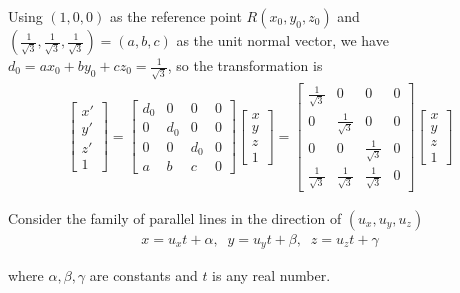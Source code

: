\documentclass[11pt]{article}  %
\begin{document}
    Using $(1,0,0)$ as the reference point $R(x_0,y_0,z_0)$ and $(\frac{1}{\sqrt{3}},\frac{1}{\sqrt{3}},\frac{1}{\sqrt{3}})=(a,b,c)$ as the unit normal vector, we have $d_0=ax_0 + by_0 + cz_0=\frac{1}{\sqrt{3}}$, so the transformation is
    \begin{align*}
        \begin{bmatrix}
            x'\\y'\\z'\\1
        \end{bmatrix}
        =
        \begin{bmatrix}
            d_0 & 0 & 0 & 0\\
            0 & d_0 & 0 & 0\\
            0 & 0 & d_0 & 0\\
            a & b & c & 0
        \end{bmatrix}
        \begin{bmatrix}
            x\\y\\z\\1
        \end{bmatrix}
        =
        \begin{bmatrix}
            \frac{1}{\sqrt{3}} & 0 & 0 & 0\\
            0 & \frac{1}{\sqrt{3}} & 0 & 0\\
            0 & 0 & \frac{1}{\sqrt{3}} & 0\\
            \frac{1}{\sqrt{3}} & \frac{1}{\sqrt{3}} & \frac{1}{\sqrt{3}} & 0
        \end{bmatrix}
        \begin{bmatrix}
            x\\y\\z\\1
        \end{bmatrix}
    \end{align*}

    Consider the family of parallel lines in the direction of $(u_x,u_y,u_z)$
    \begin{align*}
        x = u_xt+\alpha,\;\;y = u_yt+\beta,\;\;z = u_zt+\gamma
    \end{align*}

    where $\alpha,\beta,\gamma$ are constants and $t$ is any real number.\vspace{2mm}
    
\end{document}

